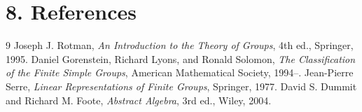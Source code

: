 \section*{8. References}

\begin{thebibliography}{9}
 Joseph J. Rotman, \emph{An Introduction to the Theory of Groups}, 4th ed., Springer, 1995.
 Daniel Gorenstein, Richard Lyons, and Ronald Solomon, \emph{The Classification of the Finite Simple Groups}, American Mathematical Society, 1994--.
 Jean-Pierre Serre, \emph{Linear Representations of Finite Groups}, Springer, 1977.
 David S. Dummit and Richard M. Foote, \emph{Abstract Algebra}, 3rd ed., Wiley, 2004.
\end{thebibliography}
